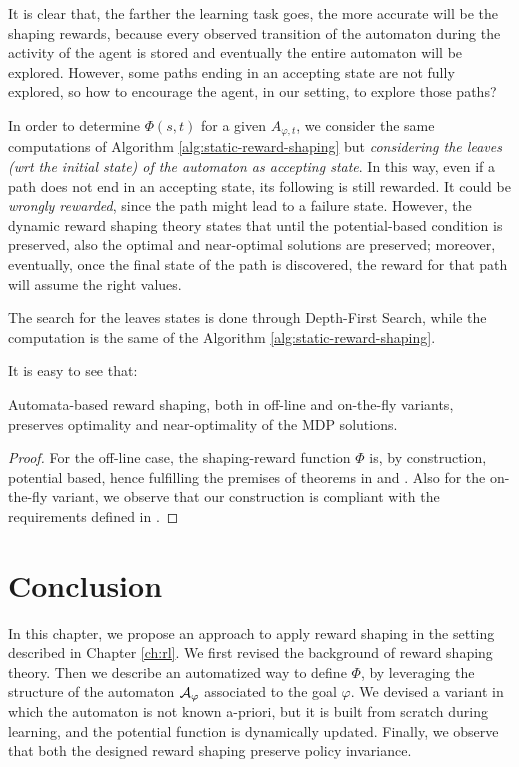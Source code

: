 It is clear that, the farther the learning task goes, the more accurate will be the shaping rewards, because every observed transition of the automaton during the activity of the agent is stored and eventually the entire automaton will be explored. However, some paths ending in an accepting state are not fully explored, so how to encourage the agent, in our setting, to explore those paths?

In order to determine $\Phi(s, t)$ for a given $A_{\varphi, t}$, we consider the same computations of Algorithm \ref{alg:static-reward-shaping} but \emph{considering the leaves (wrt the initial state) of the automaton as accepting state}. In this way, even if a path does not end in an accepting state, its following is still rewarded. It could be \emph{wrongly rewarded}, since the path might lead to a failure state. However, the dynamic reward shaping theory states that until the potential-based condition is preserved, also the optimal and near-optimal solutions are preserved; moreover, eventually, once the final state of the path is discovered, the reward for that path will assume the right values.

The search for the leaves states is done through Depth-First Search, while the computation is the same of the Algorithm \ref{alg:static-reward-shaping}.

\medskip
It is easy to see that:

\begin{theorem}
	Automata-based reward shaping, both in off-line and on-the-fly variants, preserves optimality and near-optimality of the MDP solutions.
\end{theorem}
\begin{proof} For the off-line case, the shaping-reward function $\Phi$ is, by construction, potential based, hence fulfilling the premises of theorems in \citep{Ng:1999:PIU:645528.657613} and \citep{Grzes:2017:RSE:3091125.3091208}.
	Also for the on-the-fly variant, we observe that our construction is compliant with the requirements defined in \citep{Devlin:2012:DPR:2343576.2343638}.
\end{proof}


\section{Conclusion}
In this chapter, we propose an approach to apply reward shaping in the setting described in Chapter \ref{ch:rl}. We first revised the background of reward shaping theory. Then we describe an automatized way to define $\Phi$, by leveraging the structure of the automaton $\mathcal{A}_{\varphi}$ associated to the \LLf goal $\varphi$. We devised a variant in which the automaton is not known a-priori, but it is built from scratch during learning, and the potential function is dynamically updated. Finally, we observe that both the designed reward shaping preserve policy invariance.
